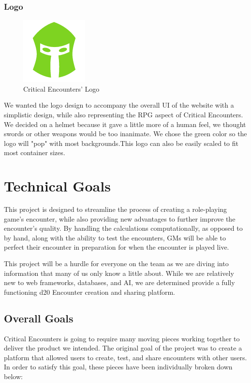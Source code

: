 \documentclass[12pt,a4paper]{report}
\begin{document}
	\subsection {Logo}
	\begin{figure}
		\includegraphics[scale=.5]{logo-large}
		\caption{Critical Encounters' Logo}
		\label{fig: Critical Encounters' Logo}
	\end{figure}
	We wanted the logo design to accompany the overall UI of the website with a simplistic design, while also representing the RPG aspect of Critical Encounters. We decided on a helmet because it gave a little more of a human feel, we thought swords or other weapons would be too inanimate. We chose the green color so the logo will "pop" with most backgrounds.This logo can also be easily scaled to fit most container sizes.

\chapter*{Technical Goals}
This project is designed to streamline the process of creating a role-playing game's encounter, while also providing new advantages to further improve the encounter's quality. By handling the calculations computationally, as opposed to by hand, along with the ability to test the encounters, GMs will be able to perfect their encounter in preparation for when the encounter is played live.

This project will be a hurdle for everyone on the team as we are diving into information that many of us only know a little about. While we are relatively new to web frameworks, databases, and AI, we are determined provide a fully functioning d20 Encounter creation and sharing platform.
	\section{Overall Goals}
	Critical Encounters is going to require many moving pieces working together to deliver the product we intended. The original goal of the project was to create a platform that allowed users to create, test, and share encounters with other users. In order to satisfy this goal, these pieces have been individually broken down below:
\end{document}
